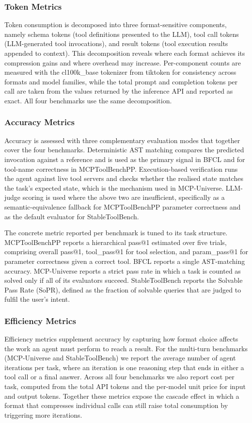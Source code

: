 \documentclass[11pt]{article}
\begin{document}
\subsubsection{Token Metrics}
Token consumption is decomposed into three format-sensitive components, namely schema tokens (tool definitions presented to the LLM), tool call tokens (LLM-generated tool invocations), and result tokens (tool execution results appended to context). This decomposition reveals where each format achieves its compression gains and where overhead may increase. Per-component counts are measured with the cl100k\_base tokenizer from tiktoken for consistency across formats and model families, while the total prompt and completion tokens per call are taken from the values returned by the inference API and reported as exact. All four benchmarks use the same decomposition.

\subsubsection{Accuracy Metrics}
Accuracy is assessed with three complementary evaluation modes that together cover the four benchmarks. Deterministic AST matching compares the predicted invocation against a reference and is used as the primary signal in BFCL and for tool-name correctness in MCPToolBenchPP. Execution-based verification runs the agent against live tool servers and checks whether the realised state matches the task's expected state, which is the mechanism used in MCP-Universe. LLM-judge scoring is used where the above two are insufficient, specifically as a semantic-equivalence fallback for MCPToolBenchPP parameter correctness and as the default evaluator for StableToolBench.

The concrete metric reported per benchmark is tuned to its task structure. MCPToolBenchPP reports a hierarchical pass@1 estimated over five trials, comprising overall pass@1, tool\_pass@1 for tool selection, and param\_pass@1 for parameter correctness given a correct tool. BFCL reports a single AST-matching accuracy. MCP-Universe reports a strict pass rate in which a task is counted as solved only if all of its evaluators succeed. StableToolBench reports the Solvable Pass Rate (SoPR), defined as the fraction of solvable queries that are judged to fulfil the user's intent.

\subsubsection{Efficiency Metrics}
\label{sec:metrics_efficiency}
Efficiency metrics supplement accuracy by capturing how format choice affects the work an agent must perform to reach a result. For the multi-turn benchmarks (MCP-Universe and StableToolBench) we report the average number of agent iterations per task, where an iteration is one reasoning step that ends in either a tool call or a final answer. Across all four benchmarks we also report cost per task, computed from the total API tokens and the per-model unit price for input and output tokens. Together these metrics expose the cascade effect in which a format that compresses individual calls can still raise total consumption by triggering more iterations.
\end{document}
